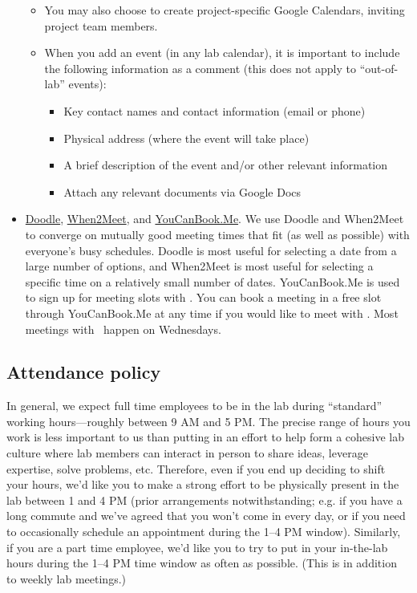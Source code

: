 \documentclass{tufte-book} %
\begin{document}
\begin{itemize}
\begin{itemize}
  \item You may also choose to create project-specific
    Google Calendars, inviting project team members.
  \item When you add an event (in any lab calendar), it is important
    to include the following information as a comment (this does not
    apply to ``out-of-lab'' events):
\begin{itemize}
  \item Key contact names and contact information (email or phone)
  \item Physical address (where the event will take place)
  \item A brief description of the event and/or other relevant information
  \item Attach any relevant documents via Google Docs
  \end{itemize}
  \end{itemize}
\item \href{http://www.doodle.com}{Doodle},
  \href{http://www.when2meet.com}{When2Meet}, and
  \href{https://context-lab.youcanbook.me/}{YouCanBook.Me}.  We use
  Doodle and When2Meet to converge on mutually good meeting times that
  fit (as well as possible) with everyone's busy schedules.  Doodle is
  most useful for selecting a date from a large number of options, and
  When2Meet is most useful for selecting a specific time on a
  relatively small number of dates.  YouCanBook.Me is used to sign up
  for meeting slots with \director.  You can book a meeting in a free
  slot through YouCanBook.Me at any time if you would like to meet
  with \director.  Most meetings with \director~happen on Wednesdays.
\end{itemize}

 \subsection{Attendance policy}
 In general, we expect full time employees to be in the lab during
 ``standard'' working hours---roughly between 9 AM and 5 PM.  The
 precise range of hours you work is less important to us than putting
 in an effort to help form a cohesive lab culture where lab members
 can interact in person to share ideas, leverage expertise, solve
 problems, etc.  Therefore, even if you end up deciding to shift your
 hours, we'd like you to make a strong effort to be physically present
 in the lab between 1 and 4 PM (prior arrangements notwithstanding;
 e.g. if you have a long commute and we've agreed that you won't come
 in every day, or if you need to occasionally schedule an
 appointment during the 1--4 PM window).  Similarly, if
 you are a part time employee, we'd like you to try to put in your
 in-the-lab hours during the 1--4 PM time window as often as
 possible.  (This is in addition to weekly lab meetings.)
\end{document}
